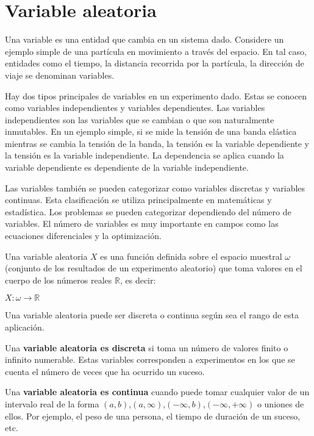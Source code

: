 \section{Variable aleatoria}

Una variable es una entidad que cambia en un sistema dado. Considere un ejemplo
simple de una partícula en movimiento a través del espacio. En tal caso,
entidades como el tiempo, la distancia recorrida por la partícula, la dirección
de viaje se denominan variables.

Hay dos tipos principales de variables en un experimento dado. Estas se conocen
como variables independientes y variables dependientes. Las variables
independientes son las variables que se cambian o que son naturalmente
inmutables. En un ejemplo simple, si se mide la tensión de una banda elástica
mientras se cambia la tensión de la banda, la tensión es la variable dependiente
y la tensión es la variable independiente. La dependencia se aplica cuando la
variable dependiente es dependiente de la variable independiente.

Las variables también se pueden categorizar como variables discretas y variables
continuas. Esta clasificación se utiliza principalmente en matemáticas y
estadística. Los problemas se pueden categorizar dependiendo del número de
variables. El número de variables es muy importante en campos como las
ecuaciones diferenciales y la optimización.

Una variable aleatoria $X$ es una función definida sobre el espacio muestral
$\omega$ (conjunto de los resultados de un experimento aleatorio) que toma
valores en el cuerpo de los números reales $\mathbb{R}$, es decir:


$ X : \omega \rightarrow \mathbb{R} $


Una variable aleatoria puede ser discreta o continua según sea el rango de esta
aplicación.


Una \textbf{variable aleatoria es discreta} si toma un número de valores finito
o infinito numerable. Estas variables corresponden a experimentos en los que se
cuenta el número de veces que ha ocurrido un suceso.


Una \textbf{variable aleatoria es continua} cuando puede tomar cualquier valor
de un intervalo real de la forma $(a, b)$,$(a,\infty)$,$(-\infty, b)$,$(-\infty,
+\infty)$ o uniones de ellos. Por ejemplo, el peso de una persona, el tiempo de
duración de un suceso, etc.

